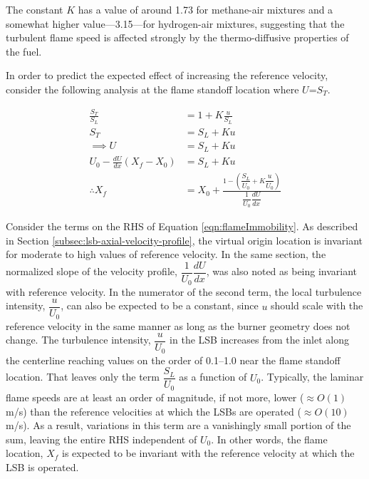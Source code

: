 
The constant \(K\) has a value of around 1.73 for methane-air mixtures and a somewhat higher value---3.15---for hydrogen-air mixtures,\cite{2009-cheng} suggesting that the turbulent flame speed is affected strongly by the thermo-diffusive properties of the fuel.

In order to predict the expected effect of increasing the reference velocity, consider the following analysis at the flame standoff location where \(U\)=\(S_T\).

\begin{align}
\frac{ S_T }{ S_L } &= 1 + K \frac{ u }{ S_L } \nonumber \\
S_T &= S_L + K u \nonumber \\
\implies U &= S_L + K u \nonumber \\
U_0 - \frac{ dU }{ dx } ( X_f - X_0 ) &= S_L + K u \nonumber \\
  \therefore X_f &= X_0 + \frac{1 - \left( \dfrac{ S_L }{ U_0 } + K\dfrac{ u }{ U_0 } \right) }{ \dfrac{ 1 }{ U_0 } \dfrac{ dU }{ dx } }
\label{eqn:flameImmobility}
\end{align}


Consider the terms on the RHS of Equation \ref{eqn:flameImmobility}.
As described in Section \ref{subsec:lsb-axial-velocity-profile}, the virtual origin location is invariant for moderate to high values of reference velocity.
In the same section, the normalized slope of the velocity profile, \(\dfrac{ 1 }{ U_0 } \dfrac{ dU }{ dx }\), was also noted as being invariant with reference velocity.
In the numerator of the second term, the local turbulence intensity, \(\dfrac{ u }{ U_0 }\), can also be expected to be a constant, since \(u\) should scale with the reference velocity in the same manner as long as the burner geometry does not change.
The turbulence intensity, \(\dfrac{ u }{ U_0 }\) in the LSB increases from the inlet along the centerline reaching values on the order of 0.1--1.0 near the flame standoff location.\cite{2008-cheng-a}
That leaves only the term \(\dfrac{ S_L }{ U_0 }\) as a function of \(U_0\).
Typically, the laminar flame speeds are at least an order of magnitude, if not more, lower (\(\approx O(1)\) m/s) than the reference velocities at which the LSBs are operated (\(\approx O(10)\) m/s).
As a result, variations in this term are a vanishingly small portion of the sum, leaving the entire RHS independent of \(U_0\).
In other words, the flame location, \(X_f\) is expected to be invariant with the reference velocity at which the LSB is operated.

